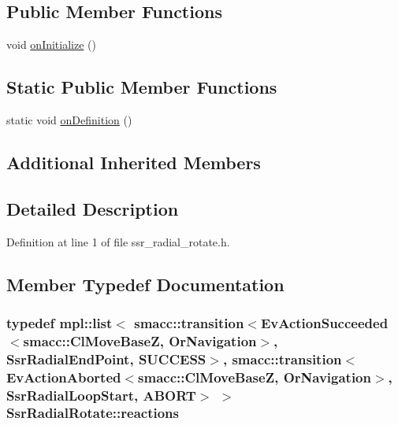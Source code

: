 \subsection*{Public Member Functions}
\begin{DoxyCompactItemize}
\item 
void \hyperlink{structSsrRadialRotate_a91b3de3b25e4cf0d3a672f6ea344abea}{on\+Initialize} ()
\end{DoxyCompactItemize}
\subsection*{Static Public Member Functions}
\begin{DoxyCompactItemize}
\item 
static void \hyperlink{structSsrRadialRotate_a96e76900952f342ee6591b84168f927f}{on\+Definition} ()
\end{DoxyCompactItemize}
\subsection*{Additional Inherited Members}


\subsection{Detailed Description}


Definition at line 1 of file ssr\+\_\+radial\+\_\+rotate.\+h.



\subsection{Member Typedef Documentation}
\subsubsection[{\texorpdfstring{reactions}{reactions}}]{\setlength{\rightskip}{0pt plus 5cm}typedef mpl\+::list$<$ {\bf smacc\+::transition}$<$Ev\+Action\+Succeeded$<${\bf smacc\+::\+Cl\+Move\+BaseZ}, {\bf Or\+Navigation}$>$, {\bf Ssr\+Radial\+End\+Point}, {\bf S\+U\+C\+C\+E\+SS}$>$, {\bf smacc\+::transition}$<$Ev\+Action\+Aborted$<${\bf smacc\+::\+Cl\+Move\+BaseZ}, {\bf Or\+Navigation}$>$, {\bf Ssr\+Radial\+Loop\+Start}, {\bf A\+B\+O\+RT}$>$ $>$ {\bf Ssr\+Radial\+Rotate\+::reactions}}\hypertarget{structSsrRadialRotate_a1bf5e4694b34ab75717c1eaa34de93e3}{}\label{structSsrRadialRotate_a1bf5e4694b34ab75717c1eaa34de93e3}


